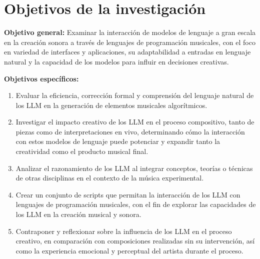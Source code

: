 \section{Objetivos de la investigación}

\textbf{Objetivo general:} Examinar la interacción de modelos de lenguaje a gran escala en la creación sonora a través de lenguajes de programación musicales, con el foco en variedad de interfaces y aplicaciones, su adaptabilidad a entradas en lenguaje natural y la capacidad de los modelos para influir en decisiones creativas.

\textbf{Objetivos específicos:}
\begin{enumerate}[label=\alph*)]
\item Evaluar la eficiencia, corrección formal y comprensión del lenguaje natural de los LLM en la generación de elementos musicales algorítmicos.
\item Investigar el impacto creativo de los LLM en el proceso compositivo, tanto de piezas como de interpretaciones en vivo, determinando cómo la interacción con estos modelos de lenguaje puede potenciar y expandir tanto la creatividad como el producto musical final.
\item Analizar el razonamiento de los LLM al integrar conceptos, teorías o técnicas de otras disciplinas en el contexto de la música experimental.
\item Crear un conjunto de scripts que permitan la interacción de los LLM con lenguajes de programación musicales, con el fin de explorar las capacidades de los LLM en la creación musical y sonora.
\item Contraponer y reflexionar sobre la influencia de los LLM en el proceso creativo, en comparación con composiciones realizadas sin su intervención, así como la experiencia emocional y perceptual del artista durante el proceso.
\end{enumerate}

